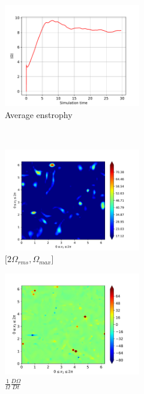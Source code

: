 \begin{figure}[H]
    \begin{subfigure}[H]{0.45\textwidth}
        \includegraphics[height=1.75in]{media/run-cds-65/enst-average1330}
        \caption{Average enstrophy}
    \end{subfigure}
    ~
    \begin{subfigure}[H]{0.45\textwidth}
        \includegraphics[height=1.75in]{media/run-cds-65/enst-2-1330}
        \caption{$[2\Omega_{rms}, \Omega_{max} $] }
    \end{subfigure}
    \newline
    \begin{subfigure}[H]{0.45\textwidth}
        \includegraphics[height=1.75in]{media/run-cds-65/enst-1330}
        \caption{$\frac{1}{\Omega} \frac{D \Omega}{Dt}$}
    \end{subfigure}
    ~
    \begin{subfigure}{0.45\textwidth}

\end{subfigure}
\end{figure}
